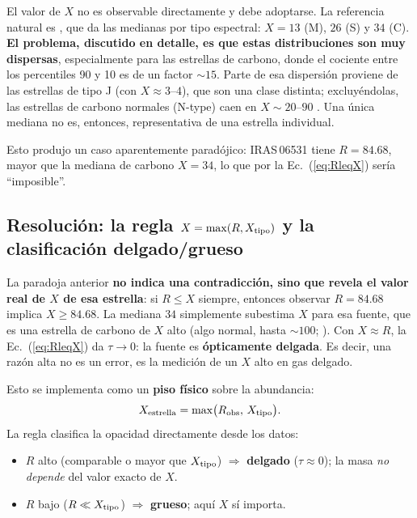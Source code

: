 \documentclass[12pt, a4paper]{article}
\begin{document}
El valor de $X$ no es observable directamente y debe adoptarse. La referencia natural es
\citet{ramstedt2014}, que da las medianas por tipo espectral: $X=13$ (M), $26$ (S) y $34$ (C).
\textbf{El problema, discutido en detalle, es que estas distribuciones son muy dispersas},
especialmente para las estrellas de carbono, donde el cociente entre los percentiles 90 y 10
es de un factor $\sim15$. Parte de esa dispersión proviene de las estrellas de tipo J
(con $X\approx3$--$4$), que son una clase distinta; excluyéndolas, las estrellas de carbono
normales (N-type) caen en $X\sim20$--$90$ \citep{lambert1986}. Una única mediana no es,
entonces, representativa de una estrella individual.

Esto produjo un caso aparentemente paradójico: IRAS\,06531 tiene $R=84.68$, mayor que la
mediana de carbono $X=34$, lo que por la Ec.~(\ref{eq:RleqX}) sería ``imposible''.

\subsection{Resolución: la regla \texorpdfstring{$X=\max(R,X_{\rm tipo})$}{X=max(R,Xtipo)} y la clasificación delgado/grueso}

La paradoja anterior \textbf{no indica una contradicción, sino que revela el valor real de
$X$ de esa estrella}: si $R\leq X$ siempre, entonces observar $R=84.68$ implica $X\geq84.68$.
La mediana $34$ simplemente subestima $X$ para esa fuente, que es una estrella de carbono de
$X$ alto (algo normal, hasta $\sim100$; \citealp{lambert1986}). Con $X\approx R$, la
Ec.~(\ref{eq:RleqX}) da $\tau\to0$: la fuente es \textbf{ópticamente delgada}. Es decir, una
razón alta no es un error, es la medición de un $X$ alto en gas delgado.

Esto se implementa como un \textbf{piso físico} sobre la abundancia:
\begin{equation}
    X_{\rm estrella} = \max\!\big(R_{\rm obs},\, X_{\rm tipo}\big).
    \label{eq:floor}
\end{equation}
La regla clasifica la opacidad directamente desde los datos:
\begin{itemize}
    \item $R$ alto (comparable o mayor que $X_{\rm tipo}$) $\Rightarrow$ \textbf{delgado} ($\tau\approx0$);
    la masa \emph{no depende} del valor exacto de $X$.
    \item $R$ bajo ($R \ll X_{\rm tipo}$) $\Rightarrow$ \textbf{grueso}; aquí $X$ sí importa.
\end{itemize}
\end{document}
